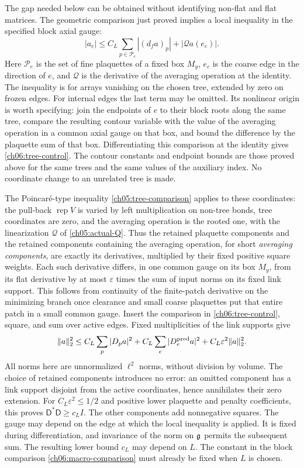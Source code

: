 The gap needed below can be obtained without identifying non-flat and flat
matrices. The geometric comparison just proved implies a local inequality in the
specified block axial gauge:
\begin{equation}
 |a_e|\le C_L\sum_{p\in\mathcal P_e}|(d_fa)_p|
                    +|\mathcal Q a(e_c)|.
 \label{ch06:tree-control}
\end{equation}
Here $\mathcal P_e$ is the set of fine plaquettes of a fixed box $M_y$,
$e_c$ is the coarse edge in the direction of $e$, and $\mathcal Q$ is
the derivative of the averaging operation at the identity. The inequality
is for arrays vanishing on the chosen tree, extended by zero on frozen
edges. For internal edges the last term may be omitted. Its nonlinear
origin is worth specifying: join the endpoints of $e$ to their block
roots along the same tree, compare the resulting contour variable with the value of the
averaging operation in a common axial gauge on that box, and bound the difference by the
plaquette sum of that box. Differentiating this comparison at the identity
gives \eqref{ch06:tree-control}. The contour constants and endpoint bounds are those proved above for the
same trees and the same values of the auxiliary index. No coordinate change to an unrelated tree is made.

The Poincar\'e-type inequality \eqref{ch05:tree-comparison} applies to these
coordinates: the pull-back $\operatorname{rep}V$ is varied by left multiplication on non-tree bonds,
tree coordinates are zero, and the averaging operation is the rooted one, with the linearization $\mathcal Q$
of \eqref{ch05:actual-Q}. Thus the retained plaquette components and the retained components containing the averaging operation, for short \emph{averaging components},
are exactly its derivatives, multiplied by their fixed positive
square weights. Each such derivative differs, in one common gauge on its
box $M_y$, from its flat derivative by at most $\varepsilon$ times the
sum of input norms on its fixed link support. This follows from continuity of
the finite-patch derivative on the minimizing branch once clearance and
small coarse plaquettes put that entire patch in a small common gauge.
Insert the comparison in \eqref{ch06:tree-control}, square, and sum over
active edges. Fixed multiplicities of the link supports give
\[
 \|a\|_2^2\le C_L\sum_p|D_p a|^2+C_L\sum_e|D_e^{\rm pred}a|^2
                         +C_L\varepsilon^2\|a\|_2^2.
\]
All norms here are unnormalized $\ell^2$ norms, without division by volume. The choice of retained
components introduces no error: an omitted component has a link support disjoint
from the active coordinates, hence annihilates their zero extension.
For $C_L\varepsilon^2\le1/2$ and positive lower plaquette and penalty
coefficients, this proves
$\mathsf D^*\mathsf D\ge c_LI$. The other components add nonnegative squares.
The gauge may depend on the edge at which the local inequality is applied.
It is fixed during differentiation, and invariance of the norm on $\mathfrak g$
permits the subsequent sum. The resulting lower bound $c_L$ may depend
on $L$. The constant in the block comparison
\eqref{ch06:macro-comparison} must already be fixed when $L$ is chosen.

